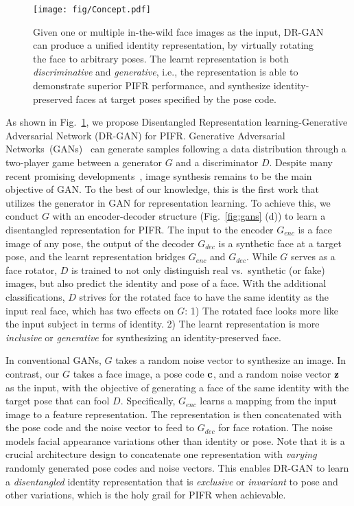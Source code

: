 \documentclass[10pt,journal,compsoc]{IEEEtran}
\begin{document}
\begin{figure}[t!]
\centering
\texttt{[image: fig/Concept.pdf]}
\vspace{-1mm}
\caption{\small Given one or multiple in-the-wild face images as the input, DR-GAN can produce a unified identity representation, by virtually rotating the face to arbitrary poses. The learnt representation is both {\it discriminative} and {\it generative}, i.e., the representation is able to demonstrate superior PIFR performance, and synthesize identity-preserved faces at target poses specified by the pose code.}
\label{fig:concept}
\figvspace 
\end{figure}%
As shown in Fig.~\ref{fig:concept}, we propose Disentangled Representation learning-Generative Adversarial Network (DR-GAN) for PIFR.
Generative Adversarial Networks~(GANs)~\cite{goodfellow2014generative} can generate samples following a data distribution through a two-player game between a generator $G$ and a discriminator $D$.
Despite many recent promising developments~\cite{mirza2014conditional, denton2015deep, radford2015unsupervised, chen2016infogan, berthelot2017began}, image synthesis remains to be the main objective of GAN.
To the best of our knowledge, this is the first work that utilizes the generator in GAN for representation learning.
To achieve this, we conduct $G$ with an encoder-decoder structure (Fig.~\ref{fig:gans} (d)) to learn a disentangled representation for PIFR.
%
The input to the encoder $G_{enc}$ is a face image of any pose, the output of the decoder $G_{dec}$ is a synthetic face at a target pose, and the learnt representation bridges $G_{enc}$ and $G_{dec}$. 
While $G$ serves as a face rotator, $D$ is trained to not only distinguish real vs.~synthetic (or fake) images, but also predict the identity and pose of a face.
With the additional classifications, $D$ strives for the rotated face to have the same identity as the input real face, which has two effects on $G$: 
1) The rotated face looks more like the input subject in terms of identity. 
2) The learnt representation is more {\it inclusive} or {\it generative} for synthesizing an identity-preserved face. 

In conventional GANs, $G$ takes a random noise vector to synthesize an image.
In contrast, our $G$ takes a face image, a pose code $\bf{c}$, and a random noise vector $\bf{z}$ as the input, with the objective of generating a face of the same identity with the target pose that can fool $D$.
Specifically, $G_{enc}$ learns a mapping from the input image to a feature representation. 
The representation is then concatenated with the pose code and the noise vector to feed to $G_{dec}$ for face rotation. 
The noise models facial appearance variations other than identity or pose. 
Note that it is a crucial architecture design to concatenate one representation with {\it varying} randomly generated pose codes and noise vectors.
This enables DR-GAN to learn a {\it disentangled} identity representation that is {\it exclusive} or {\it invariant} to pose and other variations, which is the holy grail for PIFR when achievable. 
\end{document}
